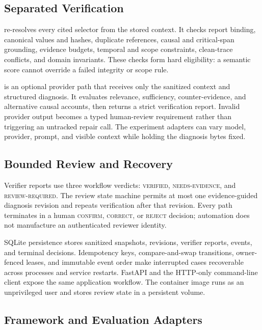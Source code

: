 \subsection{Separated Verification}

 re-resolves every cited selector from the stored
context. It checks report binding, canonical values and hashes, duplicate
references, causal and critical-span grounding, evidence budgets, temporal and
scope constraints, clean-trace conflicts, and domain invariants. These checks
form hard eligibility: a semantic score cannot override a failed integrity or
scope rule.

 is an optional provider path that receives only the
sanitized context and structured diagnosis. It evaluates relevance,
sufficiency, counter-evidence, and alternative causal accounts, then returns a
strict verification report. Invalid provider output becomes a typed
human-review requirement rather than triggering an untracked repair call. The
experiment adapters can vary model, provider, prompt, and visible context while
holding the diagnosis bytes fixed.

\subsection{Bounded Review and Recovery}

Verifier reports use three workflow verdicts: \textsc{verified},
\textsc{needs-evidence}, and \textsc{review-required}. The review state machine
permits at most one evidence-guided diagnosis revision and repeats verification
after that revision. Every path terminates in a human \textsc{confirm},
\textsc{correct}, or \textsc{reject} decision; automation does not manufacture
an authenticated reviewer identity.

SQLite persistence stores sanitized snapshots, revisions, verifier reports,
events, and terminal decisions. Idempotency keys, compare-and-swap transitions,
owner-fenced leases, and immutable event order make interrupted cases
recoverable across processes and service restarts. FastAPI and the HTTP-only
command-line client expose the same application workflow. The container image
runs as an unprivileged user and stores review state in a persistent volume.

\subsection{Framework and Evaluation Adapters}

